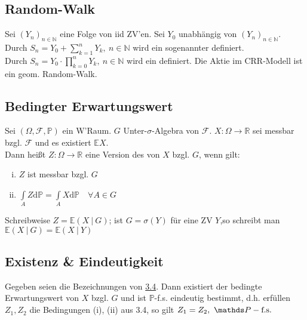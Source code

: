
\subsection{Random-Walk}
\label{sub:random_walk}
Sei $(Y_n)_{n\in \mathds{N}}$ eine Folge von iid ZV'en. Sei $Y_0$ unabhängig von $(Y_n)_{n\in \mathds{N}}$.\\
Durch $S_n=Y_0+\sum_{k=1}^{n}Y_k,~n\in \mathds{N}$ wird ein sogenannter  definiert.\\
Durch $S_n=Y_0\cdot \prod_{k=0}^{n}Y_k,~n\in \mathds{N}$ wird ein  definiert. Die Aktie im CRR-Modell ist ein geom. Random-Walk.

\newpage
\subsection{Bedingter Erwartungswert}
\label{sub:bed_ew}
Sei $(\Omega,\mathcal{F},\mathds{P})$ ein W'Raum. $G$ Unter-$\sigma$-Algebra von $\mathcal{F}$. $X:\Omega\to \mathds{R}$ sei messbar bzgl. $\mathcal{F}$ und es existiert  $\mathds{E}X$.\\
Dann heißt $Z:\Omega\to\mathds{R}$ eine Version des  von $X$ bzgl. $G$, wenn gilt:\\
\begin{enumerate}[(i)]
	\item $Z$ ist messbar bzgl. $G$
	\item $\int\limits_{A}Z\mathrm{d}\mathds{P}=\int\limits_{A}X\mathrm{d}\mathds{P}\quad \forall A\in G$
\end{enumerate}
Schreibweise $Z=\mathds{E}(X~|~G)$; ist $G=\sigma(Y)$ für eine ZV $Y$,so schreibt man $\mathds{E}(X~|~G)=\mathds{E}(X~|~Y)$


\subsection{Existenz \& Eindeutigkeit}
\label{sub:ex&eind}
Gegeben seien die Bezeichnungen von \hyperref[sub:bed_ew]{3.4}. Dann existiert der bedingte Erwartungswert von $X$ bzgl. $G$ und ist $\mathds{P}$-f.s. eindeutig bestimmt, d.h. erfüllen $Z_1,Z_2$ die Bedingungen (i), (ii) aus 3.4, so gilt $Z_1=Z_2,~\pfs$\\


